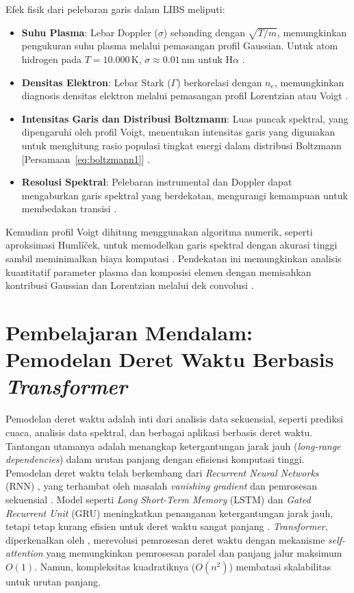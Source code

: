 Efek fisik dari pelebaran garis dalam LIBS meliputi:
\begin{itemize}
  \item \textbf{Suhu Plasma}: Lebar Doppler (\( \sigma \)) sebanding dengan \( \sqrt{T/m} \), memungkinkan pengukuran suhu plasma melalui pemasangan profil Gaussian. Untuk atom hidrogen pada \( T = 10.000 \, \text{K} \), \( \sigma \approx 0.01 \, \text{nm} \) untuk H\(\alpha\) \citep{Demtroder2010}.
  \item \textbf{Densitas Elektron}: Lebar Stark (\( \Gamma \)) berkorelasi dengan \( n_e \), memungkinkan diagnosis densitas elektron melalui pemasangan profil Lorentzian atau Voigt \citep{Griem1997,Konjevic1999}.
  \item \textbf{Intensitas Garis dan Distribusi Boltzmann}: Luas puncak spektral, yang dipengaruhi oleh profil Voigt, menentukan intensitas garis yang digunakan untuk menghitung rasio populasi tingkat energi dalam distribusi Boltzmann [Persamaan~\eqref{eq:boltzmann1}] \citep{Miziolek2006}.
  \item \textbf{Resolusi Spektral}: Pelebaran instrumental dan Doppler dapat mengaburkan garis spektral yang berdekatan, mengurangi kemampuan untuk membedakan transisi \citep{Aragon2008}.
\end{itemize}

Kemudian profil Voigt dihitung menggunakan algoritma numerik, seperti aproksimasi Humlíček, untuk memodelkan garis spektral dengan akurasi tinggi sambil meminimalkan biaya komputasi \citep{Griem1997}. Pendekatan ini memungkinkan analisis kuantitatif parameter plasma dan komposisi elemen dengan memisahkan kontribusi Gaussian dan Lorentzian melalui dek convolusi \citep{Aragon2008}.

\section{Pembelajaran Mendalam: Pemodelan Deret Waktu Berbasis \textit{Transformer}}
\label{sec:transformer_informer}

Pemodelan deret waktu adalah inti dari analisis data sekuensial, seperti prediksi cuaca, analisis data spektral, dan berbagai aplikasi berbasis deret waktu. Tantangan utamanya adalah menangkap ketergantungan jarak jauh (\textit{long-range dependencies}) dalam urutan panjang dengan efisiensi komputasi tinggi. Pemodelan deret waktu telah berkembang dari \textit{Recurrent Neural Networks} (RNN) \citep{Bengio1994}, yang terhambat oleh masalah \textit{vanishing gradient} dan pemrosesan sekuensial \citep{Hochreiter1997}. Model seperti \textit{Long Short-Term Memory} (LSTM) dan \textit{Gated Recurrent Unit} (GRU) meningkatkan penanganan ketergantungan jarak jauh, tetapi tetap kurang efisien untuk deret waktu sangat panjang \citep{Hochreiter1997}. \textit{Transformer}, diperkenalkan oleh \citet{Vaswani2017}, merevolusi pemrosesan deret waktu dengan mekanisme \textit{self-attention} yang memungkinkan pemrosesan paralel dan panjang jalur maksimum \( O(1) \). Namun, kompleksitas kuadratiknya (\( O(n^2) \)) membatasi skalabilitas untuk urutan panjang.

